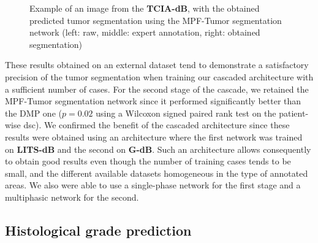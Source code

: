 \documentclass[]{article}
\newcommand{\pplfont}[1]{{\fontfamily{ppl}\selectfont #1}}
\newcommand{\lmttfont}[1]{{\fontfamily{lmtt}\selectfont #1}}
\begin{document}
\begin{figure}
\begin{minipage}{0.3\linewidth}
	\end{minipage}
	\caption{Example of an image from the \textbf{\lmttfont{TCIA-dB}}, with the obtained predicted tumor segmentation using the \pplfont{MPF-Tumor} segmentation network (left: raw, middle: expert annotation, right: obtained segmentation)}
	\label{fig:TCIAMultiphaseTumorPred}
\end{figure}


These results obtained on an external dataset tend to demonstrate a satisfactory precision
of the tumor segmentation when training our cascaded architecture with a
sufficient number of cases.
For the second stage of the cascade, we retained the \pplfont{MPF-Tumor} segmentation network since it performed
significantly better than the \pplfont{DMP} one ($ p = 0.02 $ using a Wilcoxon signed
paired rank test on the patient-wise \ac{dsc}).
We confirmed the benefit of the cascaded architecture since these results
were obtained using an architecture where the first network was trained
on \textbf{\lmttfont{LITS-dB}} and the second on \textbf{\lmttfont{G-dB}}. Such an architecture allows consequently to obtain good results even though the number of training cases tends to be small, and the different available datasets homogeneous in the type of annotated areas. We also were able to use a single-phase network for the first stage and a multiphasic network for the second.

\subsection{Histological grade prediction}
\end{document}
